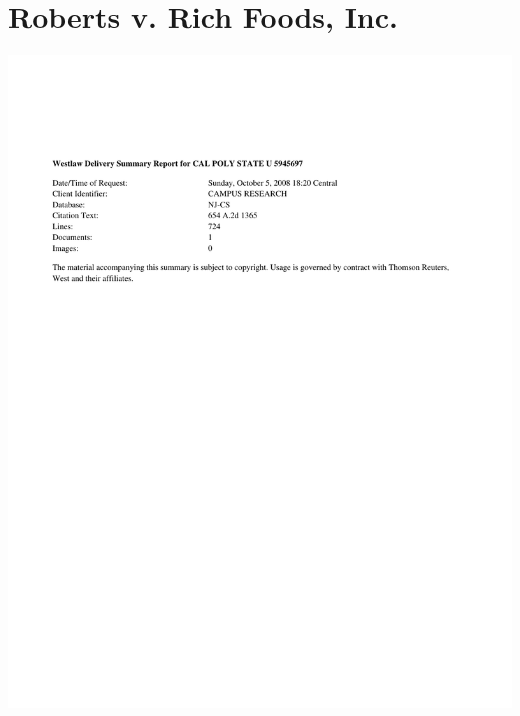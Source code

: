 \chapter{Roberts v. Rich Foods, Inc.}

\begin{center}\includegraphics{roberts/roberts0.pdf}\end{center}
